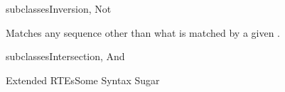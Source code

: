 \begin{frame}{ subclasses}{Inversion, Not}
  \usebox\notbox

  \bigskip

  Matches any sequence other than what is matched by a given .
\end{frame}

\begin{frame}{ subclasses}{Intersection, And}
  \usebox\andbox
 \end{frame}


\newsavebox\extendedbox
\begin{lrbox}{\extendedbox}
  \begin{minipage}{12cm}
  
  \end{minipage}
\end{lrbox}

\begin{frame}{Extended RTEs}{Some Syntax Sugar}
  \usebox\extendedbox
\end{frame}





